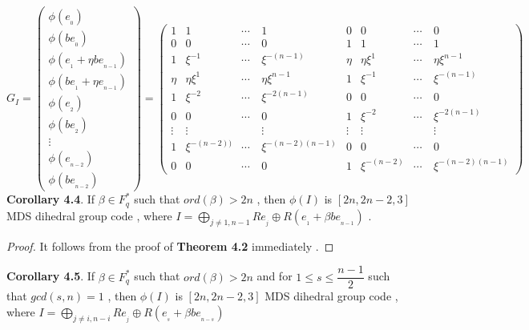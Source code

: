\documentclass{article}
\begin{document}
\begin{equation*}
    G_{I}=\begin{pmatrix}
        \phi(e_{_0})\\
        \phi(be_{_0})\\
        \phi(e_{_1}+\eta be_{_{n-1}})\\
        \phi(be_{_1}+\eta e_{_{n-1}})\\
        \phi(e_{_2})\\
        \phi(be_{_2})\\
        \vdots\\
        \phi(e_{_{n-2}})\\
        \phi(be_{_{n-2}})
    \end{pmatrix}
    =\begin{pmatrix}
        1&1&\cdots&1&0&0&\cdots&0\\
        0&0&\cdots&0&1&1&\cdots&1\\
        1&\xi^{\scriptscriptstyle-1}&\cdots&\xi^{\scriptscriptstyle-(n-1)}&\eta&\eta\xi^{\scriptscriptstyle1}&\cdots&\eta\xi^{\scriptscriptstyle n-1}\\
        \eta&\eta\xi^{\scriptscriptstyle1}&\cdots&\eta\xi^{\scriptscriptstyle n-1}&1&\xi^{\scriptscriptstyle-1}&\cdots&\xi^{\scriptscriptstyle-(n-1)}\\
        1&\xi^{\scriptscriptstyle-2}&\cdots&\xi^{\scriptscriptstyle-2(n-1)}&0&0&\cdots&0\\
        0&0&\cdots&0&1&\xi^{\scriptscriptstyle-2}&\cdots&\xi^{\scriptscriptstyle-2(n-1)}\\
        \vdots&\vdots&\quad&\vdots&\vdots&\vdots&\quad&\vdots\\
        1&\xi^{\scriptscriptstyle-(n-2))}&\cdots&\xi^{\scriptscriptstyle-(n-2)(n-1)}&0&0&\cdots&0\\
        0&0&\cdots&0&1&\xi^{\scriptscriptstyle-(n-2)}&\cdots&\xi^{\scriptscriptstyle-(n-2)(n-1)}
    \end{pmatrix}
\end{equation*}
\textbf{Corollary 4.4}. If $\beta\in{F_q^{*}}$ such that $ord(\beta)>2n$ , then $\phi(I)$ is $[2n,2n-2,3]$ MDS dihedral group code , where $I=\mathop{\bigoplus}\limits_{j\neq 1,n-1}Re_{_j}\oplus R(e_{_1}+\beta be_{_{n-1}})$ .
\begin{proof}
    It follows from the proof of \textbf{Theorem 4.2} immediately .
\end{proof}
\textbf{Corollary 4.5}. If $\beta\in{F_q^{*}}$ such that $ord(\beta)>2n$ and for $1\leq s\leq\dfrac{n-1}{2}$ such that $gcd(s,n)=1$ , then
$\phi(I)$ is $[2n,2n-2,3]$ MDS dihedral group code , where $I=\mathop{\bigoplus}\limits_{j\neq i,n-i}Re_{_j}\oplus R(e_{_s}+\beta be_{_{n-s}})$
\end{document}
